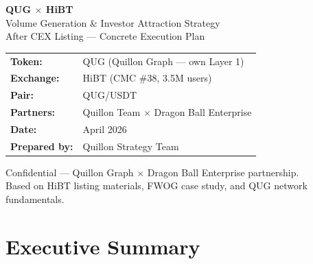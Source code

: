\documentclass[11pt,a4paper]{article}
\begin{document}
\begin{titlepage}
  \pagecolor{hibtblack}\color{white}
  \vspace*{1.8cm}
  \begin{center}
    {\fontsize{38}{46}\selectfont\bfseries\color{hibtgreen} QUG $\times$ HiBT}\\[0.3cm]
    {\fontsize{19}{26}\selectfont Volume Generation \& Investor Attraction Strategy}\\[0.2cm]
    {\large\color{midgray} After CEX Listing — Concrete Execution Plan}\\[2.8cm]

    \begin{tabular}{ll}
      \color{hibtgreen}\textbf{Token:}    & \color{white}QUG (Quillon Graph — own Layer 1) \\[4pt]
      \color{hibtgreen}\textbf{Exchange:} & \color{white}HiBT (CMC \#38, 3.5M users) \\[4pt]
      \color{hibtgreen}\textbf{Pair:}     & \color{white}QUG/USDT \\[4pt]
      \color{hibtgreen}\textbf{Partners:} & \color{white}Quillon Team $\times$ Dragon Ball Enterprise \\[4pt]
      \color{hibtgreen}\textbf{Date:}     & \color{white}April 2026 \\[4pt]
      \color{hibtgreen}\textbf{Prepared by:}& \color{white}Quillon Strategy Team \\
    \end{tabular}

    \vfill
    {\small\color{midgray}
      Confidential — Quillon Graph $\times$ Dragon Ball Enterprise partnership.\\
      Based on HiBT listing materials, FWOG case study, and QUG network fundamentals.
    }
  \end{center}
\end{titlepage}
\pagecolor{white}\color{black}

\newpage
\tableofcontents
\newpage

\section{Executive Summary}
\end{document}
